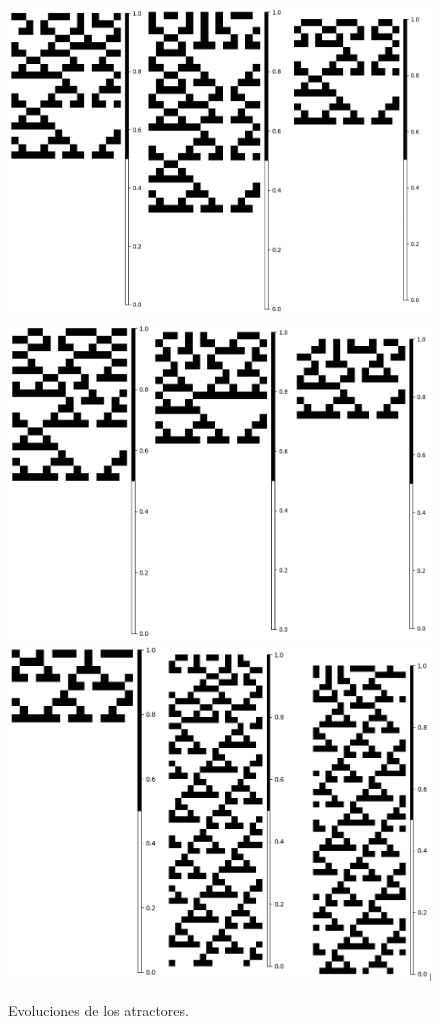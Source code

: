 \documentclass[11pt]{article}
\begin{document}
			\begin{figure}[H]
			\centering
			\includegraphics[scale=0.3]{resources/Atractores22/atractor_22_size_15_res.png}
			\includegraphics[scale=0.3]{resources/Atractores22/atractor_22_size_15_res1.png}
			\includegraphics[scale=0.3]{resources/Atractores22/atractor_22_size_15_res2.png}
			\caption{Evoluciones de los atractores.}\label{fig:picture}
			\end{figure}
\end{document}
